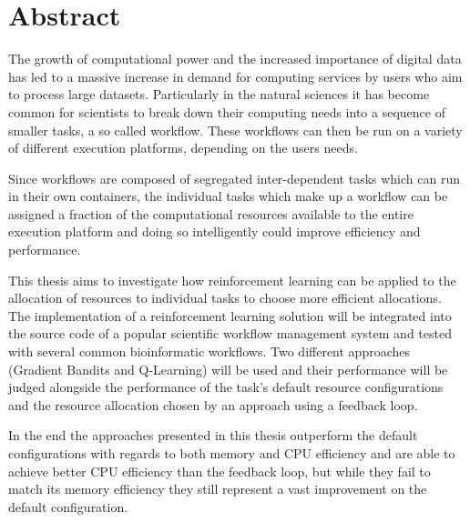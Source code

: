 
\cleardoublepage
{}
\section*{Abstract}

The growth of computational power and the increased importance of digital data has led to a massive increase in demand for computing services by users who aim to process large datasets. Particularly in the natural sciences it has become common for scientists to break down their computing needs into a sequence of smaller tasks, a so called workflow. These workflows can then be run on a variety of different execution platforms, depending on the users needs.

Since workflows are composed of segregated inter-dependent tasks which can run in their own containers, the individual tasks which make up a workflow can be assigned a fraction of the computational resources available to the entire execution platform and doing so intelligently could improve efficiency and performance.

This thesis aims to investigate how reinforcement learning can be applied to the allocation of resources to individual tasks to choose more efficient allocations. The implementation of a reinforcement learning solution will be integrated into the source code of a popular scientific workflow management system and tested with several common bioinformatic workflows. Two different approaches (Gradient Bandits and Q-Learning) will be used and their performance will be judged alongside the performance of the task's default resource configurations and the resource allocation chosen by an approach using a feedback loop.

In the end the approaches presented in this thesis outperform the default configurations with regards to both memory and CPU efficiency and are able to achieve better CPU efficiency than the feedback loop, but while they fail to match its memory efficiency they still represent a vast improvement on the default configuration.



